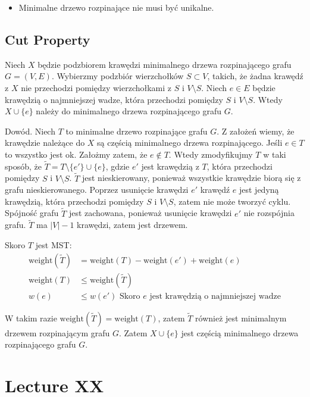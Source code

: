\documentclass{article}
\numberwithin{equation}{subsection}
\begin{document}
\begin{itemize}
    \item Minimalne drzewo rozpinające nie musi być unikalne.
\end{itemize}

\subsection{Cut Property}

Niech $X$ będzie podzbiorem krawędzi minimalnego drzewa rozpinającego grafu $G=(V,E)$. Wybierzmy podzbiór wierzchołków $S\subset V$,
takich, że żadna krawędź z $X$ nie przechodzi pomiędzy wierzchołkami z $S$ i $V\setminus S$. Niech $e\in E$ będzie krawędzią o najmniejszej
wadze, która przechodzi pomiędzy $S$ i $V\setminus S$. Wtedy $X\cup \{e\}$ należy do minimalnego drzewa rozpinającego grafu $G$.

\noindent 
Dowód. Niech $T$ to minimalne drzewo rozpinające grafu $G$. Z założeń wiemy, że krawędzie należące do $X$ są częścią 
minimalnego drzewa rozpinającego. Jeśli $e\in T$ to wszystko jest ok. Założmy zatem, że $e\notin T$. Wtedy zmodyfikujmy
$T$ w taki sposób, że $\widetilde{T}=T\setminus \{e'\}\cup \{e\}$, gdzie $e'$ jest krawędzią z $T$, która przechodzi pomiędzy $S$ i $V\setminus S$.
$\widetilde{T}$ jest nieskierowany, ponieważ wszystkie krawędzie biorą się z grafu nieskierowanego. Poprzez usunięcie krawędzi $e'$ krawędź $e$ jest jedyną
krawędzią, która przechodzi pomiędzy $S$ i $V\setminus S$, zatem nie może tworzyć cyklu. Spójność grafu $\widetilde{T}$ jest zachowana, ponieważ
usunięcie krawędzi $e'$ nie rozspójnia grafu. $\widetilde{T}$ ma $|V|-1$ krawędzi, zatem jest drzewem.

\noindent
Skoro $T$ jest MST:
\begin{align}
    \text{weight}(\widetilde{T}) &= \text{weight}(T) - \text{weight}(e') + \text{weight}(e) \\
    \text{weight}(T) &\leq \text{weight}(\widetilde{T}) \\
    w(e) &\leq w(e') \text{ Skoro $e$ jest krawędzią o najmniejszej wadze}
\end{align}

W takim razie $\text{weight}(\widetilde{T}) = \text{weight}(T)$, zatem $\widetilde{T}$ również jest minimalnym drzewem rozpinającym grafu $G$.
Zatem $X\cup \{e\}$ jest częścią minimalnego drzewa rozpinającego grafu $G$.

\section{Lecture XX}
\end{document}
